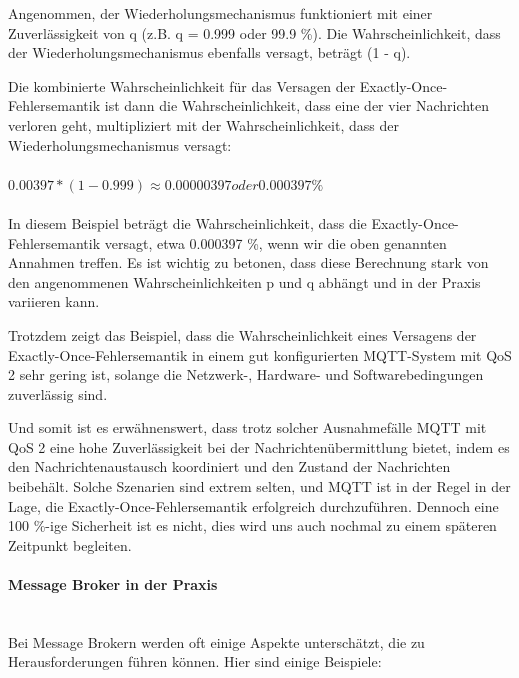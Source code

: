 Angenommen, der Wiederholungsmechanismus funktioniert mit einer Zuverlässigkeit von q (z.B. q = 0.999 oder 99.9 \%). Die Wahrscheinlichkeit, dass der Wiederholungsmechanismus ebenfalls versagt, beträgt (1 - q).

Die kombinierte Wahrscheinlichkeit für das Versagen der Exactly-Once-Fehlersemantik ist dann die Wahrscheinlichkeit, dass eine der vier Nachrichten verloren geht, multipliziert mit der Wahrscheinlichkeit, dass der Wiederholungsmechanismus versagt:
\\\\
$0.00397 * (1 - 0.999) \approx 0.00000397 oder 0.000397 \%$
\\\\
In diesem Beispiel beträgt die Wahrscheinlichkeit, dass die Exactly-Once-Fehlersemantik versagt, etwa 0.000397 \%, wenn wir die oben genannten Annahmen treffen. Es ist wichtig zu betonen, dass diese Berechnung stark von den angenommenen Wahrscheinlichkeiten p und q abhängt und in der Praxis variieren kann.

Trotzdem zeigt das Beispiel, dass die Wahrscheinlichkeit eines Versagens der Exactly-Once-Fehlersemantik in einem gut konfigurierten MQTT-System mit QoS 2 sehr gering ist, solange die Netzwerk-, Hardware- und Softwarebedingungen zuverlässig sind.

Und somit ist es erwähnenswert, dass trotz solcher Ausnahmefälle MQTT mit QoS 2 eine hohe Zuverlässigkeit bei der Nachrichtenübermittlung bietet, indem es den Nachrichtenaustausch koordiniert und den Zustand der Nachrichten beibehält. Solche Szenarien sind extrem selten, und MQTT ist in der Regel in der Lage, die Exactly-Once-Fehlersemantik erfolgreich durchzuführen. Dennoch eine 100 \%-ige Sicherheit ist es nicht, dies wird uns auch nochmal zu einem späteren Zeitpunkt begleiten. 

\paragraph{Message Broker in der Praxis\\\\}

Bei Message Brokern werden oft einige Aspekte unterschätzt, die zu Herausforderungen führen können. Hier sind einige Beispiele:

